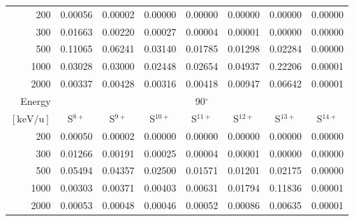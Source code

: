 \begin{table}[ht]
\begin{tabular}{r|c|c|c|c|c|c|c}
    200   & 0.00056 & 0.00002 & 0.00000 & 0.00000 & 0.00000 & 0.00000 & 0.00000 \\
    300   & 0.01663 & 0.00220 & 0.00027 & 0.00004 & 0.00001 & 0.00000 & 0.00000 \\
    500   & 0.11065 & 0.06241 & 0.03140 & 0.01785 & 0.01298 & 0.02284 & 0.00000 \\
    1000  & 0.03028 & 0.03000 & 0.02448 & 0.02654 & 0.04937 & 0.22206 & 0.00001 \\
    2000  & 0.00337 & 0.00428 & 0.00316 & 0.00418 & 0.00947 & 0.06642 & 0.00001 \\ \cline{1-8}
    Energy & \multicolumn{7}{c}{90$^\circ$} \\ \cline{2-8}
    $\mathrm{[keV/u]}$ & S$^{8+}$ & S$^{9+}$ & S$^{10+}$ & S$^{11+}$ & S$^{12+}$ & S$^{13+}$ & S$^{14+}$ \\ \cline{1-8}
    200   & 0.00050 & 0.00002 & 0.00000 & 0.00000 & 0.00000 & 0.00000 & 0.00000 \\
    300   & 0.01266 & 0.00191 & 0.00025 & 0.00004 & 0.00001 & 0.00000 & 0.00000 \\
    500   & 0.05494 & 0.04357 & 0.02500 & 0.01571 & 0.01201 & 0.02175 & 0.00000 \\
    1000  & 0.00303 & 0.00371 & 0.00403 & 0.00631 & 0.01794 & 0.11836 & 0.00001 \\
    2000  & 0.00053 & 0.00048 & 0.00046 & 0.00052 & 0.00086 & 0.00635 & 0.00001 \\ \cline{1-8}
    \end{tabular}
    \label{tab:XRayEffODE1}
\end{table}

